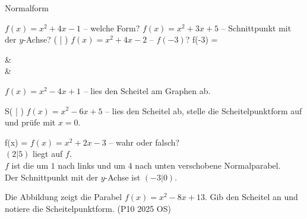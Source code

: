 \setcounter{aufgabe}{14}

\begin{aufgabe}{Normalform}
\begin{teile}
\teil $f(x) = x^2 + 4x - 1$ – welche Form?  
\teil $f(x) = x^2 + 3x + 5$ – Schnittpunkt mit der $y$-Achse? ( \leerfeld | \leerfeld )
\teil $f(x) = x^2 + 4x - 2$ – $f(-3)$? f(-3) = \leerfeld
\end{teile}
\begin{gleichungsraster}[2]
 &
 \\
 &
\end{gleichungsraster}
\begin{teile}
\teil $f(x) = x^2 - 4x + 1$ – lies den Scheitel am Graphen ab.

\begin{ksys}[xmin=-1,xmax=5,ymin=-4,ymax=2,ablesen]
\end{ksys}
S( \leerfeld | \leerfeld )
\teil $f(x) = x^2 - 6x + 5$ – lies den Scheitel ab, stelle die Scheitelpunktform auf und prüfe mit $x = 0$.

\begin{ksys}[xmin=-1,xmax=6,ymin=-5,ymax=1,ablesen]
\end{ksys}
f(x) = \leerfeld
\teil $f(x) = x^2 + 2x - 3$ – wahr oder falsch? \\ $(2|5)$ liegt auf $f$.   \\ $f$ ist die um $1$ nach links und um $4$ nach unten verschobene Normalparabel.   \\ Der Schnittpunkt mit der $y$-Achse ist $(-3|0)$.  

\begin{ksys}[xmin=-4,xmax=3,ymin=-5,ymax=6,ablesen]
\end{ksys}
\teil Die Abbildung zeigt die Parabel $f(x) = x^2 - 8x + 13$. Gib den Scheitel an und notiere die Scheitelpunktform. \hfill (P10 2025 OS) \\


\end{teile}
\end{aufgabe}
